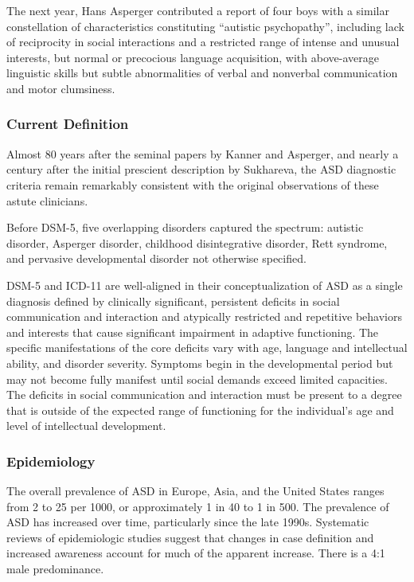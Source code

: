 The next year, Hans Asperger contributed a report of four boys with a similar
constellation of characteristics constituting ``autistic psychopathy'',
including lack of reciprocity in social interactions and a restricted range of
intense and unusual interests, but normal or precocious language acquisition,
with above-average linguistic skills but subtle abnormalities of verbal and
nonverbal communication and motor clumsiness. \cite{Myers2025}

\subsubsection{Current Definition}
Almost 80 years after the seminal papers by Kanner and Asperger, and nearly a
century after the initial prescient description by Sukhareva, the ASD
diagnostic criteria remain remarkably consistent with the original observations
of these astute clinicians. \cite{Myers2025}

Before DSM-5, five overlapping disorders captured the spectrum: autistic
disorder, Asperger disorder, childhood disintegrative disorder, Rett syndrome,
and pervasive developmental disorder not otherwise specified.
\cite{Boland2021-by}

DSM-5 and ICD-11 are well-aligned in their conceptualization of ASD as a single
diagnosis defined by clinically significant, persistent deficits in social
communication and interaction and atypically restricted and repetitive
behaviors and interests that cause significant impairment in adaptive
functioning. The specific manifestations of the core deficits vary with age,
language and intellectual ability, and disorder severity. Symptoms begin in
the developmental period but may not become fully manifest until social demands
exceed limited capacities. The deficits in social communication and interaction
must be present to a degree that is outside of the expected range of
functioning for the individual’s age and level of intellectual development.
\cite{DSM5TR, Myers2025}

\subsubsection{Epidemiology}
The overall prevalence of ASD in Europe, Asia, and the United States ranges
from 2 to 25 per 1000, or approximately 1 in 40 to 1 in 500. The prevalence of
ASD has increased over time, particularly since the late 1990s. Systematic
reviews of epidemiologic studies suggest that changes in case definition and
increased awareness account for much of the apparent increase.
There is a 4:1 male predominance. \cite{AutismUpToDate, Nelson58} 

